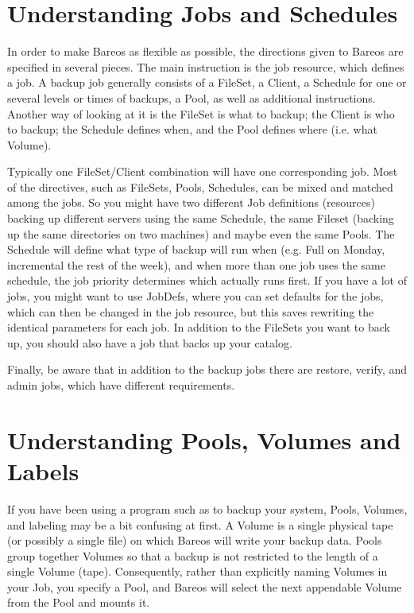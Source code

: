 \section{Understanding Jobs and Schedules}
\label{JobsandSchedules}

In order to make Bareos as flexible as possible, the directions given
to Bareos are specified in several pieces.  The main instruction is the
job resource, which defines a job.  A backup job generally consists of a
FileSet, a Client, a Schedule for one or several levels or times of backups,
a Pool, as well as additional instructions. Another way of looking
at it is the FileSet is what to backup; the Client is who to backup; the
Schedule defines when, and the Pool defines where (i.e. what Volume).

Typically one FileSet/Client combination will have one corresponding job.
Most of the directives, such as FileSets, Pools, Schedules, can be mixed
and matched among the jobs.  So you might have two different Job
definitions (resources) backing up different servers using the same
Schedule, the same Fileset (backing up the same directories on two machines)
and maybe even the same Pools.  The Schedule will define what type of
backup will run when (e.g. Full on Monday, incremental the rest of the
week), and when more than one job uses the same schedule, the job priority
determines which actually runs first.  If you have a lot of jobs, you might
want to use JobDefs, where you can set defaults for the jobs, which can
then be changed in the job resource, but this saves rewriting the
identical parameters for each job.  In addition to the FileSets you want to
back up, you should also have a job that backs up your catalog.

Finally, be aware that in addition to the backup jobs there are
restore, verify, and admin jobs, which have different requirements.

\section{Understanding Pools, Volumes and Labels}
\label{PoolsVolsLabels}

If you have been using a program such as  to backup your system,
Pools, Volumes, and labeling may be a bit confusing at first. A Volume is a
single physical tape (or possibly a single file) on which Bareos will write
your backup data. Pools group together Volumes so that a backup is not
restricted to the length of a single Volume (tape). Consequently, rather than
explicitly naming Volumes in your Job, you specify a Pool, and Bareos will
select the next appendable Volume from the Pool and mounts it.


